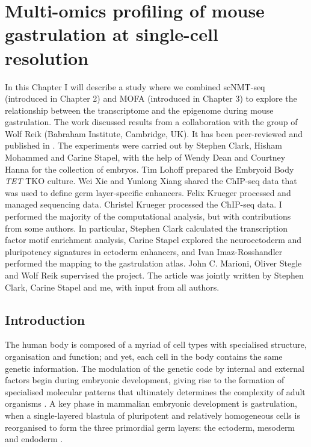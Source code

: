 \graphicspath{{Chapter3/Figs/}}

\chapter{Multi-omics profiling of mouse gastrulation at single-cell resolution}

In this Chapter I will describe a study where we combined scNMT-seq (introduced in Chapter 2) and MOFA (introduced in Chapter 3) to explore the relationship between the transcriptome and the epigenome during mouse gastrulation. The work discussed results from a collaboration with the group of Wolf Reik (Babraham Institute, Cambridge, UK). It has been peer-reviewed and published in \cite{Argelaguet2019}. The experiments were carried out by Stephen Clark, Hisham Mohammed and Carine Stapel, with the help of Wendy Dean and Courtney Hanna for the collection of embryos. Tim Lohoff prepared the Embryoid Body \textit{TET} TKO culture. Wei Xie and Yunlong Xiang shared the ChIP-seq data that was used to define germ layer-specific enhancers. Felix Krueger processed and managed sequencing data. Christel Krueger processed the ChIP-seq data. I performed the majority of the computational analysis, but with contributions from some authors. In particular, Stephen Clark calculated the transcription factor motif enrichment analysis, Carine Stapel explored the neuroectoderm and pluripotency signatures in ectoderm enhancers, and Ivan Imaz-Rosshandler performed the mapping to the gastrulation atlas. John C. Marioni, Oliver Stegle and Wolf Reik supervised the project. The article was jointly written by Stephen Clark, Carine Stapel and me, with input from all authors.

\section{Introduction}

The human body is composed of a myriad of cell types with specialised structure, organisation and function; and yet, each cell in the body contains the same genetic information. The modulation of the genetic code by internal and external factors begin during embryonic development, giving rise to the formation of specialised molecular patterns that ultimately determines the complexity of adult organisms \cite{Rosalind2018}. A key phase in mammalian embryonic development is gastrulation, when a single-layered blastula of pluripotent and relatively homogeneous cells is reorganised to form the three primordial germ layers: the ectoderm, mesoderm and endoderm \cite{Tam1997, Solnica-Krezel2012, Tam2007}.

